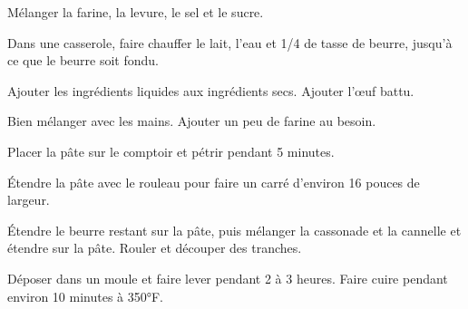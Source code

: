 \begin{steps}
    \item Mélanger la farine, la levure, le sel et le sucre.
    \item Dans une casserole, faire chauffer le lait, l'eau et 1/4 de tasse de beurre, jusqu'à ce que le beurre soit fondu.
    \item Ajouter les ingrédients liquides aux ingrédients secs. Ajouter l'œuf battu.
    \item Bien mélanger avec les mains. Ajouter un peu de farine au besoin.
    \item Placer la pâte sur le comptoir et pétrir pendant 5 minutes.
    \item Étendre la pâte avec le rouleau pour faire un carré d'environ 16 pouces de largeur.
    \item Étendre le beurre restant sur la pâte, puis mélanger la cassonade et la cannelle et étendre sur la pâte. Rouler et découper des tranches.
    \item Déposer dans un moule et faire lever pendant 2 à 3 heures. Faire cuire pendant environ 10 minutes à 350°F.
\end{steps}
